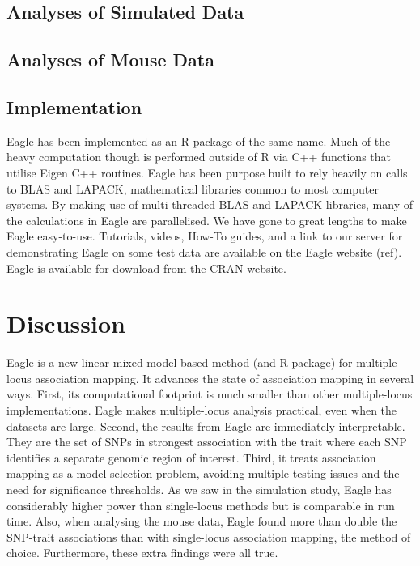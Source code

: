 \documentclass{nature}
\begin{document}
\subsection{Analyses of Simulated Data}

\subsection{Analyses of Mouse Data}




\subsection{Implementation}

Eagle has been implemented as an R package of the same name. Much of the heavy computation though is performed outside of R 
via C++ functions that utilise Eigen C++ routines. Eagle has been purpose built to rely heavily on calls to BLAS and LAPACK, 
mathematical libraries common to most computer systems. By making use of multi-threaded  BLAS and LAPACK libraries, many of the 
calculations in Eagle are parallelised. We have gone to great lengths to make Eagle easy-to-use. Tutorials, videos, How-To guides, and 
a link to our server for demonstrating Eagle on some test data are available on the Eagle website (ref).  
Eagle is available for download from the CRAN website. 

  
  
\section{Discussion}
Eagle is a new linear mixed model based method (and R package) for multiple-locus association mapping. It advances the state of association mapping in several ways. 
First, its computational footprint is much smaller than other multiple-locus implementations. Eagle makes multiple-locus analysis 
practical, even when the datasets are large. Second, the results from
 Eagle are immediately interpretable. They are the set of SNPs in strongest association with the trait where 
each SNP identifies a separate genomic region of interest. Third, it treats association mapping as a model selection problem, avoiding 
multiple testing issues and the need for significance thresholds. 
 As we saw in the simulation study, Eagle has considerably higher power than single-locus methods but is comparable in run time.
Also, when analysing the mouse data, Eagle found more than double the SNP-trait associations than 
with single-locus association mapping, the method of choice. Furthermore, these extra findings were all true. 
\end{document}
